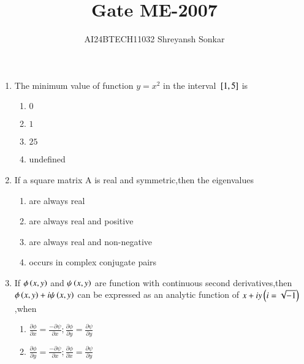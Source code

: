 \documentclass[journal]{IEEEtran}
\begin{document}

\vspace{3cm}


\renewcommand{\thefigure}{\theenumi}
\renewcommand{\thetable}{\theenumi}
\setlength{\intextsep}{10pt} %


\renewcommand{\thetable}{\theenumi}

\title{Gate ME-2007}
\author{AI24BTECH11032 Shreyansh Sonkar
}
\maketitle
\renewcommand{\thefigure}{\theenumi}
\renewcommand{\thetable}{\theenumi}
\begin{enumerate}
\item The minimum  value of function $y=x^{2}$ in the interval ${}\left[1,5\right]$ is 
\begin{multicols}{4}
    \begin{enumerate}
        \item $0$
        \item $1$
        \item $25$
        \item undefined
    \end{enumerate}
\end{multicols}
\bigskip
\item If a square matrix A is real and symmetric,then the eigenvalues 
\begin{enumerate}
        \item are always real
        \item are always real and positive 
        \item are always real and non-negative
        \item occurs in complex conjugate pairs
 \end{enumerate}
\bigskip
\item If $\phi\left(x,y\right)$ and $\psi\left(x,y\right)$ are function with continuous  second derivatives,then$\phi\left(x,y\right)+i\psi\left(x,y\right)$ can be expressed as an analytic function of $x+iy\left(i=\sqrt{-1}\right)$,when
\begin{enumerate}
        \item $\frac{\partial\phi}{\partial x}=\frac{-\partial\psi}{\partial x};\frac{\partial\phi}{\partial y}=\frac{\partial\psi}{\partial y}$
        \item $\frac{\partial\phi}{\partial y}=\frac{-\partial\psi}{\partial x};\frac{\partial\phi}{\partial x}=\frac{\partial\psi}{\partial y}$

\end{enumerate}
\end{enumerate}
\end{document}
